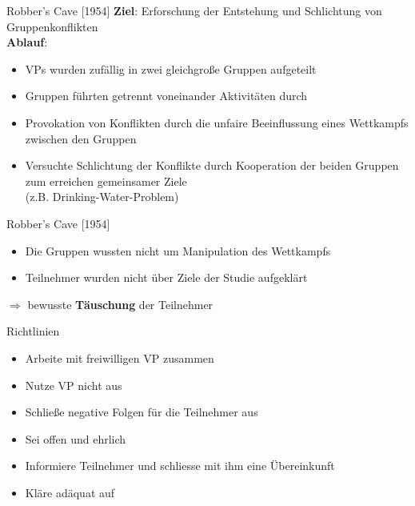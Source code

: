 \documentclass[10pt]{beamer}
\begin{document}
	\begin{frame}{Robber's Cave [1954]}
		\textbf{Ziel}: Erforschung der Entstehung und Schlichtung von Gruppenkonflikten\\
		\textbf{Ablauf}:
		
			
		\begin{itemize}
			\item VPs wurden zufällig in zwei gleichgroße Gruppen aufgeteilt
			\item Gruppen führten getrennt voneinander Aktivitäten durch
			\item Provokation von Konflikten durch die unfaire Beeinflussung eines Wettkampfs zwischen den Gruppen
			\item Versuchte Schlichtung der Konflikte durch Kooperation der beiden Gruppen zum erreichen gemeinsamer Ziele \\(z.B. Drinking-Water-Problem)
		\end{itemize}
		
	\end{frame}	

	\begin{frame}{Robber's Cave [1954]}
		\begin{itemize}
			\item Die Gruppen wussten nicht um Manipulation des Wettkampfs
			\item Teilnehmer wurden nicht über Ziele der Studie aufgeklärt
		\end{itemize}
		$\Rightarrow$ bewusste \textbf{Täuschung} der Teilnehmer
	\end{frame}	

	\begin{frame}{Richtlinien}
		
		\begin{itemize}
			\item Arbeite mit freiwilligen VP zusammen
			\item Nutze VP nicht aus
			\item Schließe negative Folgen für die Teilnehmer aus
			\item Sei offen und ehrlich
			\item Informiere Teilnehmer und schliesse mit ihm eine Übereinkunft
			\item Kläre adäquat auf
		
		\end{itemize}
		
	\end{frame}
	
\end{document}
